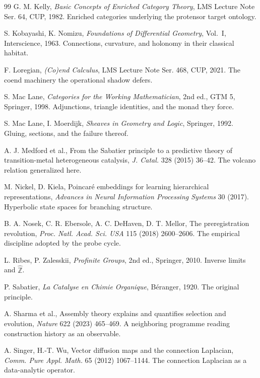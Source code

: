 \documentclass[12pt,openany]{book}
\theoremstyle{remark}
\newcommand{\wideZ}{\widehat{\mathbb Z}}
\begin{document}
\begin{thebibliography}{99}
 G. M. Kelly, \emph{Basic Concepts of Enriched Category Theory}, LMS Lecture Note Ser. 64, CUP, 1982. Enriched categories underlying the protensor target ontology.

 S. Kobayashi, K. Nomizu, \emph{Foundations of Differential Geometry}, Vol.~I, Interscience, 1963. Connections, curvature, and holonomy in their classical habitat.

 F. Loregian, \emph{(Co)end Calculus}, LMS Lecture Note Ser. 468, CUP, 2021. The coend machinery the operational shadow defers.

 S. Mac Lane, \emph{Categories for the Working Mathematician}, 2nd ed., GTM 5, Springer, 1998. Adjunctions, triangle identities, and the monad they force.

 S. Mac Lane, I. Moerdijk, \emph{Sheaves in Geometry and Logic}, Springer, 1992. Gluing, sections, and the failure thereof.

 A. J. Medford et al., From the Sabatier principle to a predictive theory of transition-metal heterogeneous catalysis, \emph{J. Catal.} 328 (2015) 36--42. The volcano relation generalized here.

 M. Nickel, D. Kiela, Poincar\'e embeddings for learning hierarchical representations, \emph{Advances in Neural Information Processing Systems} 30 (2017). Hyperbolic state spaces for branching structure.

 B. A. Nosek, C. R. Ebersole, A. C. DeHaven, D. T. Mellor, The preregistration revolution, \emph{Proc. Natl. Acad. Sci. USA} 115 (2018) 2600--2606. The empirical discipline adopted by the probe cycle.

 L. Ribes, P. Zalesskii, \emph{Profinite Groups}, 2nd ed., Springer, 2010. Inverse limits and $\wideZ$.

 P. Sabatier, \emph{La Catalyse en Chimie Organique}, B\'eranger, 1920. The original principle.

 A. Sharma et al., Assembly theory explains and quantifies selection and evolution, \emph{Nature} 622 (2023) 465--469. A neighboring programme reading construction history as an observable.

 A. Singer, H.-T. Wu, Vector diffusion maps and the connection Laplacian, \emph{Comm. Pure Appl. Math.} 65 (2012) 1067--1144. The connection Laplacian as a data-analytic operator.


\end{thebibliography}
\end{document}
